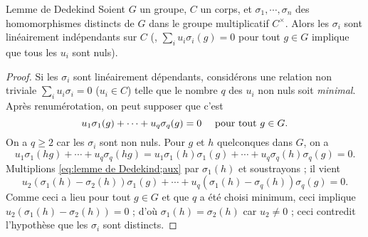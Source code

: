 \documentclass[11pt, useosf,
  title in boldface,
  theorem in new line,
  theorem numbering = section,
  number theorems separately,
]{simplivre}
\begin{document}
    \smallskip
    \begin{theorem-with-name}{Lemme de Dedekind}
        Soient \( G \) un groupe, \( C \) un corps, et \( \sigma_1, \cdots, \sigma_n \) des homomorphismes distincts de \( G \) dans le groupe multiplicatif \( C^\times \). Alors les \( \sigma_i \) sont linéairement indépendants sur \( C \) (\ie, \( \sum_{i} u_i \sigma_i(g) = 0 \) pour tout \( g \in G \) implique que tous les \( u_i \) sont nuls).
    \end{theorem-with-name}
    \begin{proof}
        Si les \( \sigma_i \) sont linéairement dépendants, considérons une relation non triviale \( \sum_i u_i \sigma_i = 0 \) (\( u_i \in C \)) telle que le nombre \( q \) des \( u_i \) non nuls soit \emph{minimal}. Après renumérotation, on peut supposer que c'est
        \begin{equation}\label{eq:lemme de Dedekind;aux}
            u_1 \sigma_1(g) + \cdots + u_q \sigma_q(g) = 0 \quad \text{ pour tout \( g \in G \).}
        \end{equation}
        On a \( q \geqslant 2 \) car les \( \sigma_i \) sont non nuls. Pour \( g \) et \( h \) quelconques dans \( G \), on a
        \[
            u_1 \sigma_1(hg) + \cdots + u_q \sigma_q(hg) = u_1 \sigma_1(h)\sigma_1(g) + \cdots + u_q \sigma_q(h)\sigma_q(g) = 0.
        \]
        Multiplions \eqref{eq:lemme de Dedekind;aux} par \( \sigma_1(h) \) et soustrayons ; il vient
        \[
            u_2 (\sigma_1(h)-\sigma_2(h))\sigma_1(g) + \cdots + u_q (\sigma_1(h)-\sigma_q(h))\sigma_q(g) = 0.
        \]
        Comme ceci a lieu pour tout \( g \in G \) et que \( q \) a été choisi minimum, ceci implique \( u_2(\sigma_1(h)-\sigma_2(h)) = 0 \) ; d'où \( \sigma_1(h) = \sigma_2(h) \) car \( u_2 \neq 0 \) ; ceci contredit l'hypothèse que les \( \sigma_i \) sont distincts.
    \end{proof}

    \medskip
\end{document}

